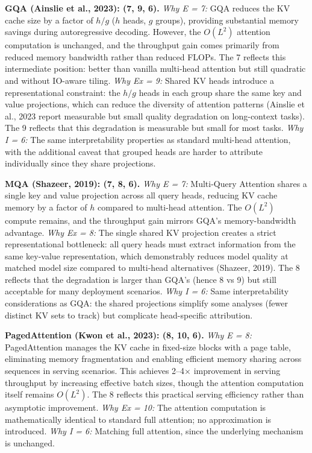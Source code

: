 \documentclass[10pt,twocolumn]{article}
\begin{document}
\textbf{GQA (Ainslie et al., 2023): (7, 9, 6).}
\textit{Why E = 7:} GQA reduces the KV cache size by a factor of $h/g$ ($h$ heads, $g$ groups), providing substantial memory savings during autoregressive decoding. However, the $O(L^2)$ attention computation is unchanged, and the throughput gain comes primarily from reduced memory bandwidth rather than reduced FLOPs. The 7 reflects this intermediate position: better than vanilla multi-head attention but still quadratic and without IO-aware tiling. \textit{Why Ex = 9:} Shared KV heads introduce a representational constraint: the $h/g$ heads in each group share the same key and value projections, which can reduce the diversity of attention patterns (Ainslie et al., 2023 report measurable but small quality degradation on long-context tasks). The 9 reflects that this degradation is measurable but small for most tasks. \textit{Why I = 6:} The same interpretability properties as standard multi-head attention, with the additional caveat that grouped heads are harder to attribute individually since they share projections.

\textbf{MQA (Shazeer, 2019): (7, 8, 6).}
\textit{Why E = 7:} Multi-Query Attention shares a single key and value projection across all query heads, reducing KV cache memory by a factor of $h$ compared to multi-head attention. The $O(L^2)$ compute remains, and the throughput gain mirrors GQA's memory-bandwidth advantage. \textit{Why Ex = 8:} The single shared KV projection creates a strict representational bottleneck: all query heads must extract information from the same key-value representation, which demonstrably reduces model quality at matched model size compared to multi-head alternatives (Shazeer, 2019). The 8 reflects that the degradation is larger than GQA's (hence 8 vs 9) but still acceptable for many deployment scenarios. \textit{Why I = 6:} Same interpretability considerations as GQA: the shared projections simplify some analyses (fewer distinct KV sets to track) but complicate head-specific attribution.

\textbf{PagedAttention (Kwon et al., 2023): (8, 10, 6).}
\textit{Why E = 8:} PagedAttention manages the KV cache in fixed-size blocks with a page table, eliminating memory fragmentation and enabling efficient memory sharing across sequences in serving scenarios. This achieves 2--4$\times$ improvement in serving throughput by increasing effective batch sizes, though the attention computation itself remains $O(L^2)$. The 8 reflects this practical serving efficiency rather than asymptotic improvement. \textit{Why Ex = 10:} The attention computation is mathematically identical to standard full attention; no approximation is introduced. \textit{Why I = 6:} Matching full attention, since the underlying mechanism is unchanged.
\end{document}
